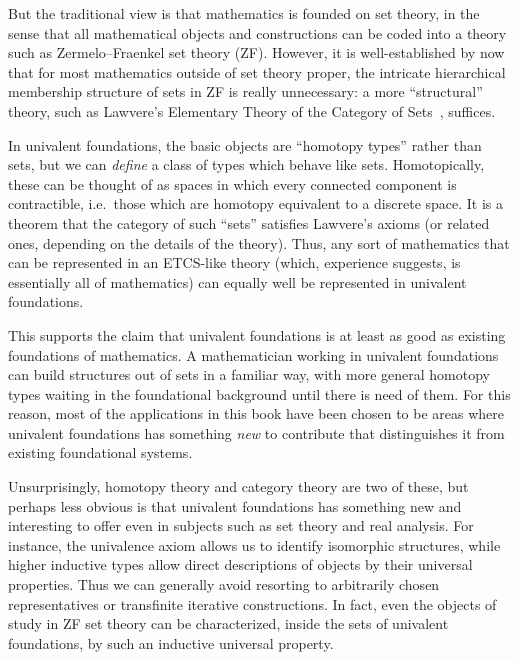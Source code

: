 But the traditional view is that mathematics is founded on set theory, in the sense that all mathematical objects and constructions can be coded into a theory such as Zermelo--Fraenkel set theory (ZF).
%
%
%
%
However, it is well-established by now that for most mathematics outside of set theory proper, the intricate hierarchical membership structure of sets in ZF is really unnecessary: a more ``structural'' theory, such as Lawvere's Elementary Theory of the Category of Sets~\cite{lawvere:etcs-long}, suffices.
%

In univalent foundations, the basic objects are ``homotopy types'' rather than sets, but we can \emph{define} a class of types which behave like sets.
Homotopically, these can be thought of as spaces in which every connected component is contractible, i.e.\ those which are homotopy equivalent to a discrete space.
%
It is a theorem  that the category of such ``sets'' satisfies Lawvere's axioms (or related ones, depending on the details of the theory).
Thus, any sort of mathematics that can be represented in an ETCS-like theory (which, experience suggests, is essentially all of mathematics) can equally well be represented in univalent foundations.  

This supports the claim that univalent foundations is at least as good as existing foundations of mathematics.
A mathematician working in univalent foundations can build structures out of sets in a familiar way, with more general homotopy types waiting in the foundational background until there is need of them.
For this reason, most of the applications in this book have been chosen to be areas where univalent foundations has something \emph{new} to contribute that distinguishes it from existing foundational systems.

Unsurprisingly, homotopy theory and category theory are two of these, but perhaps less obvious is that univalent foundations has something new and interesting to offer even in subjects such as set theory and real analysis.
For instance, the univalence axiom allows us to identify isomorphic structures, while higher inductive types allow direct descriptions of objects by their universal properties.
Thus we can generally avoid resorting to arbitrarily chosen representatives or transfinite iterative constructions.
In fact, even the objects of study in ZF set theory can be characterized, inside the sets of univalent foundations, by such an inductive universal property.

